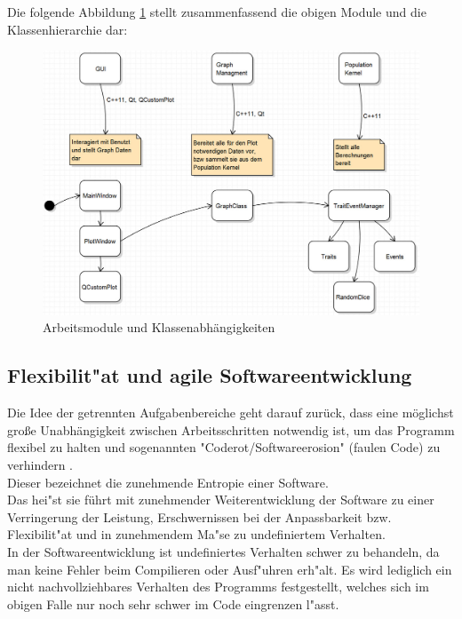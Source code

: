 \documentclass[11pt, a4paper, german]{article}
\theoremstyle{plain}
\begin{document}
 	Die folgende Abbildung \ref{Module und Klassen} stellt zusammenfassend die obigen Module und die Klassenhierarchie dar:
	\begin{figure}[H]
		\centering
		\includegraphics[width=1 \linewidth]{./Pictures/Bild_Module}
		\caption[Module]{Arbeitsmodule und Klassenabhängigkeiten}
		\label{Module und Klassen}
	\end{figure}	
		
	\subsection{Flexibilit"at und agile Softwareentwicklung}
	Die Idee der getrennten Aufgabenbereiche geht darauf zurück, dass eine möglichst große Unabhängigkeit zwischen Arbeitsschritten notwendig ist, um das Programm flexibel zu halten und sogenannten "{}Coderot/Softwareerosion"{} (faulen Code) zu verhindern \cite{martin2008clean}. \\
	Dieser bezeichnet die zunehmende Entropie einer Software.\\ 
	Das hei"st sie führt mit zunehmender Weiterentwicklung der Software zu einer Verringerung der Leistung, Erschwernissen bei der Anpassbarkeit bzw. Flexibilit"at und in zunehmendem Ma"se zu undefiniertem Verhalten.\\
	In der Softwareentwicklung ist undefiniertes Verhalten schwer zu behandeln, da man keine Fehler beim Compilieren oder Ausf"uhren erh"alt. Es wird lediglich ein nicht nachvollziehbares Verhalten des Programms festgestellt, welches sich im obigen Falle nur noch sehr schwer im Code eingrenzen l"asst.\\
	
\end{document}
